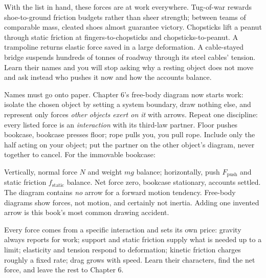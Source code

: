 With the list in hand, these forces are at work everywhere. Tug-of-war rewards shoe-to-ground friction budgets rather than sheer strength; between teams of comparable mass, cleated shoes almost guarantee victory. Chopsticks lift a peanut through static friction at fingers-to-chopsticks and chopsticks-to-peanut. A trampoline returns elastic force saved in a large deformation. A cable-stayed bridge suspends hundreds of tonnes of roadway through its steel cables' tension. Learn their names and you will stop asking why a resting object does not move and ask instead who pushes it now and how the accounts balance.

Names must go onto paper. Chapter 6's free-body diagram now starts work: isolate the chosen object by setting a system boundary, draw nothing else, and represent only forces \emph{other objects exert on it} with arrows. Repeat one discipline: every listed force is an \emph{interaction} with its third-law partner. Floor pushes bookcase, bookcase presses floor; rope pulls you, you pull rope. Include only the half acting on your object; put the partner on the other object's diagram, never together to cancel. For the immovable bookcase:

\begin{center}
\end{center}

Vertically, normal force \(N\) and weight \(mg\) balance; horizontally, push \(F_{\text{push}}\) and static friction \(f_{\text{static}}\) balance. Net force zero, bookcase stationary, accounts settled. The diagram contains \emph{no} arrow for a forward motion tendency. Free-body diagrams show forces, not motion, and certainly not inertia. Adding one invented arrow is this book's most common drawing accident.


\begin{oneline}
Every force comes from a specific interaction and sets its own price: gravity always reports for work; support and static friction supply what is needed up to a limit; elasticity and tension respond to deformation; kinetic friction charges roughly a fixed rate; drag grows with speed. Learn their characters, find the net force, and leave the rest to Chapter 6.
\end{oneline}

